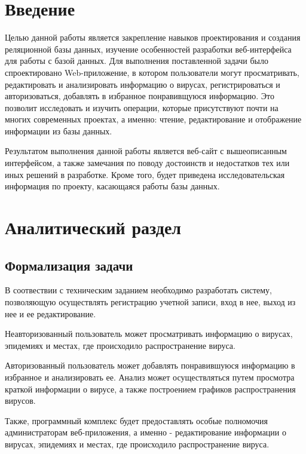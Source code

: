 \documentclass[a4paper,14pt]{extarticle}
\begin{document}
 	
 	\newpage
 	
 	\tableofcontents
 	\newpage
 	\section*{Введение}
 	
 	Целью данной работы является закрепление навыков проектирования и создания реляционной базы данных, изучение особенностей разработки веб-интерфейса для работы с базой данных. Для выполнения поставленной задачи было спроектировано Web-приложение, в котором пользователи могут просматривать, редактировать и анализировать информацию о вирусах, регистрироваться и авторизоваться, добавлять в избранное понравивщуюся информацию. Это позволит исследовать  и изучить операции, которые присутствуют почти на многих современных проектах, а именно: чтение, редактирование и отображение информации из базы данных.
 	
 	Результатом выполнения данной работы является веб-сайт с  вышеописанным интерфейсом, а также замечания по поводу достоинств и недостатков тех или иных решений в разработке. Кроме того, будет приведена исследовательская информация по проекту, касающаяся работы базы данных.
 	
 	
 	\newpage
 	\section{Аналитический раздел}
 	
 	\subsection{Формализация задачи}\label{main}
 	
 	В соотвествии с техническим заданием необходимо разработать систему,
 	позволяющую осуществлять регистрацию учетной записи, вход в нее, выход из нее и ее редактирование.
 	
 	Неавторизованный пользователь может просматривать информацию о вирусах, эпидемиях и местах, где происходило распространение вируса.
 	
 	Авторизованный пользователь может добавлять понравившуюся информацию в избранное и анализировать ее. Анализ может осуществляться путем просмотра краткой информации о вирусе, а также построением графиков распространения вирусов.
 	
 	Также, программный комплекс будет предоставлять особые полномочия администраторам веб-приложения, а именно - редактирование информации о вирусах, эпидемиях и местах, где происходило распространение вируса.
 	
\end{document}
